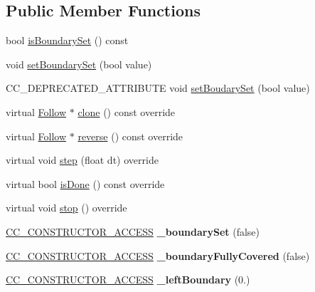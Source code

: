 \subsection*{Public Member Functions}
\begin{DoxyCompactItemize}
\item 
bool \hyperlink{classFollow_a3f4d2d2ab13c544d7c40aa2a96fb2719}{is\+Boundary\+Set} () const
\item 
void \hyperlink{classFollow_ad01fd1c960695a80e893300d3996bb13}{set\+Boundary\+Set} (bool value)
\item 
C\+C\+\_\+\+D\+E\+P\+R\+E\+C\+A\+T\+E\+D\+\_\+\+A\+T\+T\+R\+I\+B\+U\+TE void \hyperlink{classFollow_a509872f55b024bef0b5e4b8f4ca54692}{set\+Boudary\+Set} (bool value)
\item 
virtual \hyperlink{classFollow}{Follow} $\ast$ \hyperlink{classFollow_a52db9888349a5ae3c601a55c42586a65}{clone} () const override
\item 
virtual \hyperlink{classFollow}{Follow} $\ast$ \hyperlink{classFollow_a1b9dd57b4347bcaf927f2f4e3cf4db65}{reverse} () const override
\item 
virtual void \hyperlink{classFollow_a0f027ac080c352070a653d1dbb8f761d}{step} (float dt) override
\item 
virtual bool \hyperlink{classFollow_a7b551b92d3313e4fe3aadbed45283911}{is\+Done} () const override
\item 
virtual void \hyperlink{classFollow_a2cd8dbd76066ecb517c6d5bdca032d6c}{stop} () override
\item 
\mbox{\label{classFollow_abcee9c5efe03ea988363556dbb33c352}} 
\hyperlink{_2cocos2d_2cocos_2base_2ccConfig_8h_a25ef1314f97c35a2ed3d029b0ead6da0}{C\+C\+\_\+\+C\+O\+N\+S\+T\+R\+U\+C\+T\+O\+R\+\_\+\+A\+C\+C\+E\+SS} {\bfseries \+\_\+boundary\+Set} (false)
\item 
\mbox{\label{classFollow_a6a3e68a5a061663b0b15bfb675a35881}} 
\hyperlink{_2cocos2d_2cocos_2base_2ccConfig_8h_a25ef1314f97c35a2ed3d029b0ead6da0}{C\+C\+\_\+\+C\+O\+N\+S\+T\+R\+U\+C\+T\+O\+R\+\_\+\+A\+C\+C\+E\+SS} {\bfseries \+\_\+boundary\+Fully\+Covered} (false)
\item 
\mbox{\label{classFollow_adcdd03b4a8669a1f3c087665aa61251d}} 
\hyperlink{_2cocos2d_2cocos_2base_2ccConfig_8h_a25ef1314f97c35a2ed3d029b0ead6da0}{C\+C\+\_\+\+C\+O\+N\+S\+T\+R\+U\+C\+T\+O\+R\+\_\+\+A\+C\+C\+E\+SS} {\bfseries \+\_\+left\+Boundary} (0.)

\end{DoxyCompactItemize}
